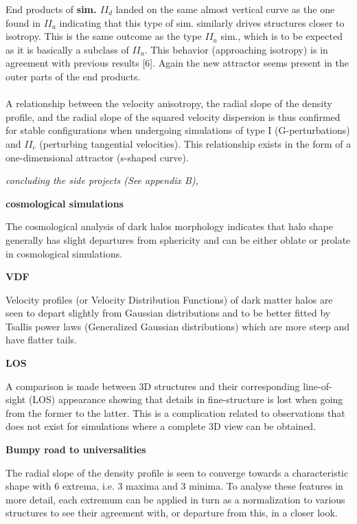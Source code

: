 End products of \textbf{sim. $II_d$} landed on the same almost vertical curve as the one found in $II_a$ indicating that this type of sim. similarly drives structures closer to isotropy. This is the same outcome as the type $II_a$ sim., which is to be expected as it is basically a subclass of $II_a$. This behavior (approaching isotropy) is in agreement with previous results [6]. Again the new attractor seems present in the outer parts of the end products. \\ \\

A relationship between the velocity anisotropy, the radial slope of the density profile, and the radial slope of the squared velocity dispersion is thus confirmed for stable configurations when undergoing simulations of type I (G-perturbations) and $II_c$ (perturbing tangential velocities).
This relationship exists in the form of a one-dimensional attractor (s-shaped curve). 

\centerline{\textit{concluding the side projects (See appendix B),}} 
\centerline{\textbf{cosmological simulations}} 
The cosmological analysis of dark halos morphology indicates that halo shape generally has slight departures from sphericity and can be either oblate or prolate in cosmological simulations. \\

\centerline{\textbf{VDF}} 
Velocity profiles (or Velocity Distribution Functions) of dark matter halos are seen to depart slightly from Gaussian distributions and to be better fitted by Tsallis power laws (Generalized Gaussian distributions) which are more steep and have flatter tails. \\

\centerline{\textbf{LOS}} 
A comparison is made between 3D structures and their corresponding line-of-sight (LOS) appearance showing that details in fine-structure is lost when going from the former to the latter. This is a complication related to observations that does not exist for simulations where a complete 3D view can be obtained.

\centerline{\textbf{Bumpy road to universalities}} 
The radial slope of the density profile is seen to converge towards a characteristic shape with 6 extrema, i.e. 3 maxima and 3 minima. To analyse these features in more detail, each extremum can be applied in turn as a normalization to various structures to see their agreement with, or departure from this, in a closer look. \\ \\


